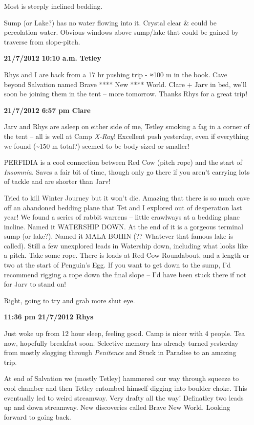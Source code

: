 Most is steeply inclined bedding.

Sump (or Lake?) has no water flowing into it. Crystal clear \& could be
percolation water. Obvious windows above sump/lake that could be gained
by traverse from slope-pitch.

\textbf{21/7/2012 10:10 a.m. Tetley}

Rhys and I are back from a 17 hr pushing trip - ≈100 m in the book. Cave
beyond Salvation named Brave **** New **** World. Clare + Jarv in bed,
we'll soon be joining them in the tent -- more tomorrow. Thanks Rhys for
a great trip!

\textbf{21/7/2012 6:57 pm Clare}

Jarv and Rhys are asleep on either side of me, Tetley smoking a fag in a
corner of the tent -- all is well at Camp \emph{X-Ray}! Excellent push
yesterday, even if everything we found (\textasciitilde 150 m total?)
seemed to be body-sized or smaller!

PERFIDIA is a cool connection between Red Cow (pitch rope) and the start
of \emph{Insomnia}. Saves a fair bit of time, though only go there if
you aren't carrying lots of tackle and are shorter than Jarv!

Tried to kill Winter Journey but it won't die. Amazing that there is so
much cave off an abandoned bedding plane that Tet and I explored out of
desperation last year! We found a series of rabbit warrens -- little
crawlways at a bedding plane incline. Named it WATERSHIP DOWN. At the
end of it is a gorgeous terminal sump (or lake?). Named it MALA BOHIN
(?? Whatever that famous lake is called). Still a few unexplored leads
in Watership down, including what looks like a pitch. Take some rope.
There is loads at Red Cow Roundabout, and a length or two at the start
of Penguin's Egg. If you want to get down to the sump, I'd recommend
rigging a rope down the final slope -- I'd have been stuck there if not
for Jarv to stand on!

Right, going to try and grab more shut eye.

\textbf{11:36 pm 21/7/2012 Rhys}

Just woke up from 12 hour sleep, feeling good. Camp is nicer with 4
people. Tea now, hopefully breakfast soon. Selective memory has already
turned yesterday from mostly slogging through \emph{Penitence} and Stuck
in Paradise to an amazing trip.

At end of Salvation we (mostly Tetley) hammered our way through squeeze
to cool chamber and then Tetley entombed himself digging into boulder
choke. This eventually led to weird streamway. Very drafty all the way!
Definatley two leads up and down streamway. New discoveries called Brave
New World. Looking forward to going back.

